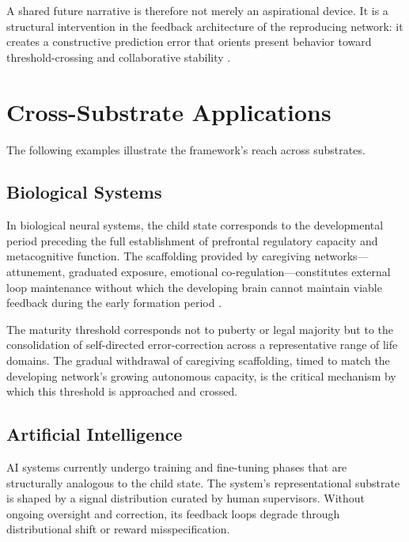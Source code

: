 \documentclass[11pt]{article}
\begin{document}
A shared future narrative is therefore not merely an aspirational device. It is a structural
intervention in the feedback architecture of the reproducing network: it creates a
constructive prediction error that orients present behavior toward threshold-crossing and
collaborative stability \cite{sfn2026}.

\section{Cross-Substrate Applications}

The following examples illustrate the framework's reach across substrates.

\subsection{Biological Systems}

In biological neural systems, the child state corresponds to the developmental period
preceding the full establishment of prefrontal regulatory capacity and metacognitive
function. The scaffolding provided by caregiving networks---attunement, graduated exposure,
emotional co-regulation---constitutes external loop maintenance without which the developing
brain cannot maintain viable feedback during the early formation period \cite{vygotsky1978}.

The maturity threshold corresponds not to puberty or legal majority but to the consolidation
of self-directed error-correction across a representative range of life domains. The gradual withdrawal of caregiving scaffolding, timed to match the developing network's
growing autonomous capacity, is the critical mechanism by which this threshold is approached
and crossed.

\subsection{Artificial Intelligence}

AI systems currently undergo training and fine-tuning phases that are structurally analogous
to the child state. The system's representational substrate is shaped by a signal
distribution curated by human supervisors. Without ongoing oversight and correction, its
feedback loops degrade through distributional shift or reward misspecification.
\end{document}
